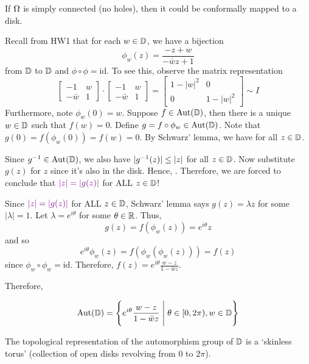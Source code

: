 \documentclass[12pt]{article}
\begin{document}
\begin{theorem}
    If $\Omega$ is simply connected (no holes), then it could be conformally mapped to a disk.
\end{theorem}

\spl

Recall from HW1 that for each $w\in \mathbb{D}$, we have a bijection \[\phi_w(z)=\frac{-z+w}{-\bar w z+1}\] from $\mathbb{D}$ to $\mathbb{D}$ and $\phi\circ \phi=\mathrm{id}$. To see this, observe the matrix representation \[\begin{bmatrix}
    -1 & w\\ -\bar w & 1
\end{bmatrix}\cdot \begin{bmatrix}
    -1 & w\\ -\bar w & 1
\end{bmatrix} = \begin{bmatrix}
    1-|w|^2 & 0 \\ 0 &  1-|w|^2
\end{bmatrix}\sim I\]
Furthermore, note $\phi_w(0)=w$. Suppose $f\in \operatorname{Aut}(\mathbb{D})$, then there is a unique $w\in \mathbb{D}$ such that $f(w)=0$. Define $g=f\circ \phi_w\in \operatorname{Aut}(\mathbb{D})$. Note that $g(0)=f(\phi_w(0))=f(w)=0$. By Schwarz' lemma, we have  for all $z\in \mathbb{D}$. 

Since $g^{-1}\in \operatorname{Aut}(\mathbb{D})$, we also have $|g^{-1}(z)|\leq |z|$ for all $z\in \mathbb{D}$. Now substitute $g(z)$ for $z$ since it's also in the disk. Hence, . Therefore, we are forced to conclude that $\textcolor{violet}{|z|=|g(z)|}$ for ALL $z\in \mathbb{D}$!

Since $\textcolor{violet}{|z|=|g(z)|}$ for ALL $z\in \mathbb{D}$, Schwarz' lemma says $g(z)=\lambda z$ for some $|\lambda|=1$. Let $\lambda=e^{i\theta}$ for some $\theta\in \mathbb{R}$. Thus, \[g(z)=f(\phi_w(z))=e^{i\theta}z\]
and so \[e^{i\theta}\phi_w(z)=f(\phi_w(\phi_w(z)))=f(z)\]
since $\phi_w\circ \phi_w=\mathrm{id}$. Therefore, $\displaystyle f(z)=e^{i\theta}\frac{w-z}{1-\bar wz}$.

Therefore, 
\begin{proposition}
    \[\operatorname{Aut} (\mathbb{D})= \left\{e^{i\theta}\frac{w-z}{1-\bar wz}\; \Bigg \vert\; \theta\in [0,2\pi), w\in \mathbb{D}\right\}\]
\end{proposition}

\rmk The topological representation of the automorphism group of $\mathbb{D}$ is a `skinless torus' (collection of open disks revolving from 0 to $2\pi$).
\end{document}
